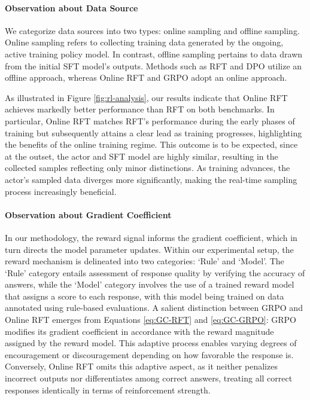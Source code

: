 \begin{itemize}[topsep=0pt]
\begin{itemize}[topsep=0pt]
\paragraph{Observation about Data Source} We categorize data sources into two types: online sampling and offline sampling. Online sampling refers to collecting training data generated by the ongoing, active training policy model. In contrast, offline sampling pertains to data drawn from the initial SFT model's outputs. Methods such as RFT and DPO utilize an offline approach, whereas Online RFT and GRPO adopt an online approach.

As illustrated in Figure \ref{fig:rl-analysis}, our results indicate that Online RFT achieves markedly better performance than RFT on both benchmarks. In particular, Online RFT matches RFT’s performance during the early phases of training but subsequently attains a clear lead as training progresses, highlighting the benefits of the online training regime. This outcome is to be expected, since at the outset, the actor and SFT model are highly similar, resulting in the collected samples reflecting only minor distinctions. As training advances, the actor's sampled data diverges more significantly, making the real-time sampling process increasingly beneficial.

\paragraph{Observation about Gradient Coefficient} In our methodology, the reward signal informs the gradient coefficient, which in turn directs the model parameter updates. Within our experimental setup, the reward mechanism is delineated into two categories: `Rule' and `Model'. The `Rule' category entails assessment of response quality by verifying the accuracy of answers, while the `Model' category involves the use of a trained reward model that assigns a score to each response, with this model being trained on data annotated using rule-based evaluations. A salient distinction between GRPO and Online RFT emerges from Equations \ref{eq:GC-RFT} and \ref{eq:GC-GRPO}: GRPO modifies its gradient coefficient in accordance with the reward magnitude assigned by the reward model. This adaptive process enables varying degrees of encouragement or discouragement depending on how favorable the response is. Conversely, Online RFT omits this adaptive aspect, as it neither penalizes incorrect outputs nor differentiates among correct answers, treating all correct responses identically in terms of reinforcement strength.


\end{itemize}
\end{itemize}
